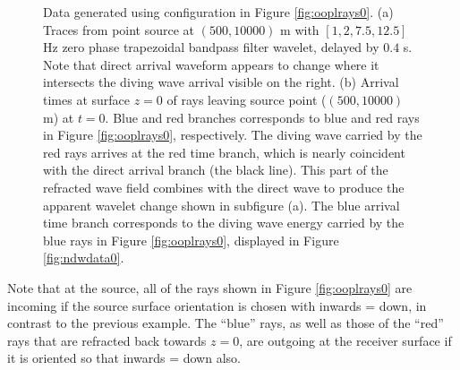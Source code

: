 \documentclass[12pt]{geophysics}
\begin{document}
\begin{figure}
  \centering
  \caption{Data generated using configuration in Figure
    \ref{fig:ooplrays0}. (a) Traces from point source at $(500,10000)$ m
    with $[1, 2, 7.5, 12.5]$ Hz zero phase trapezoidal bandpass
    filter wavelet, delayed by $0.4$ s. Note that direct arrival
    waveform appears to change where it intersects the diving wave
    arrival visible on the right. (b) Arrival times at surface $z=0$
    of rays leaving source point ($(500,10000)$ m) at $t=0$. Blue
    and red branches corresponds to blue and red rays in Figure
    \ref{fig:ooplrays0}, respectively. The diving wave carried by
    the red rays arrives at the red time branch, which is nearly
    coincident with the direct arrival branch (the black line). This
    part of the refracted wave field combines with
    the direct wave to produce the apparent wavelet change shown in 
    subfigure (a). The blue arrival time branch corresponds to the diving
    wave energy carried by the blue rays in Figure
    \ref{fig:ooplrays0}, displayed in Figure \ref{fig:ndwdata0}.}
\end{figure}

Note that at the source, all of the rays shown in Figure
\ref{fig:ooplrays0} are incoming if the source surface
orientation is chosen with inwards = down, in contrast to the previous
example. The ``blue'' rays, as well as those of the ``red'' rays that
are refracted back towards $z=0$, are outgoing at
the receiver surface if it is oriented so that inwards = down
also.
\end{document}
